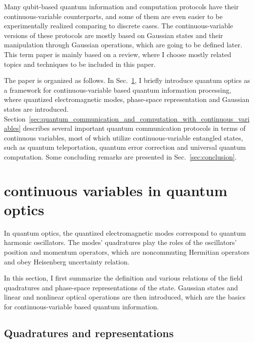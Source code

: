 \documentclass[%
 reprint,
groupedaddress,
showpacs,
 amsmath,amssymb,
 aps,
prb,
]{revtex4-1}
\begin{document}
	Many qubit-based quantum information and computation protocols have their continuous-variable counterparts, and some of them are even easier to be experimentally realized comparing to discrete cases. The continuous-variable versions of these protocols are mostly based on Gaussian states and their manipulation through Gaussian operations, which are going to be defined later. This term paper is mainly based on a review,\cite{Braunstein2005} where I choose mostly related topics and techniques to be included in this paper.

	The paper is organized as follows. In Sec.~\ref{sec:continuous_variables_in_quantum_optics}, I briefly introduce quantum optics as a framework for continuous-variable based quantum information processing, where quantized electromagnetic modes, phase-space representation and Gaussian states are introduced. Section~\ref{sec:quantum_communication_and_computation_with_continuous_variables} describes several important quantum communication protocols in terms of continuous variables, most of which utilize continuous-variable entangled states, such as quantum teleportation, quantum error correction and universal quantum computation. Some concluding remarks are presented in Sec.~\ref{sec:conclusion}.



\section{continuous variables in quantum optics} %
\label{sec:continuous_variables_in_quantum_optics}

	In quantum optics, the quantized electromagnetic modes correspond to quantum harmonic oscillators. The modes' quadratures play the roles of the oscillators' position and momentum operators, which are noncommuting Hermitian operators and obey Heisenberg uncertainty relation.

	In this section, I first summarize the definition and various relations of the field quadratures and phase-space representations of the state. Gaussian states and linear and nonlinear optical operations are then introduced, which are the basics for continuous-variable based quantum information.

	\subsection{Quadratures and representations} %
	\label{sub:quadratures_and_representations}
	
\end{document}

